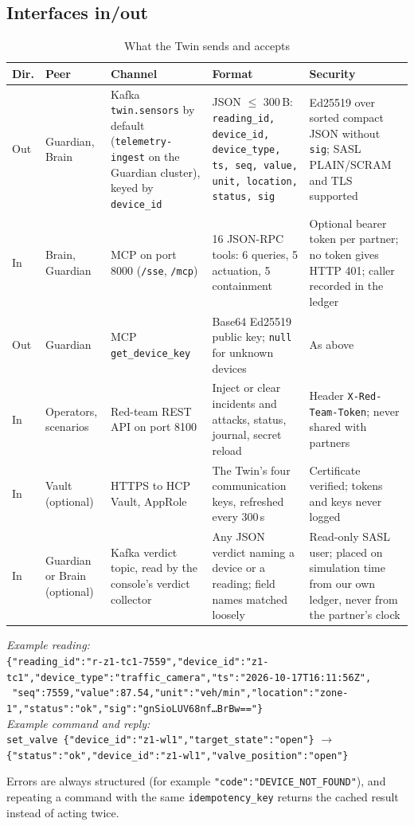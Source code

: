 \documentclass[10pt,a4paper]{article}
\begin{document}
\subsection{Interfaces in/out}
\begin{table}[H]
\centering
\scriptsize
\renewcommand{\arraystretch}{0.92}
\caption{What the Twin sends and accepts}
\label{tab:interfaces}
\begin{tabularx}{\textwidth}{L{0.8cm}L{1.6cm}L{3.6cm}L{4.1cm}Y}
\toprule
\textbf{Dir.} & \textbf{Peer} & \textbf{Channel} & \textbf{Format} & \textbf{Security} \\
\midrule
Out & Guardian, Brain & Kafka \texttt{twin.sensors} by default (\texttt{telemetry-ingest} on the Guardian cluster), keyed by \texttt{device\_id} & JSON $\le$ 300\,B: \texttt{reading\_id, device\_id, device\_type, ts, seq, value, unit, location, status, sig} & Ed25519 over sorted compact JSON without \texttt{sig}; SASL PLAIN/SCRAM and TLS supported \\
In & Brain, Guardian & MCP on port 8000 (\texttt{/sse}, \texttt{/mcp}) & 16 JSON-RPC tools: 6 queries, 5 actuation, 5 containment & Optional bearer token per partner; no token gives HTTP 401; caller recorded in the ledger \\
Out & Guardian & MCP \texttt{get\_device\_key} & Base64 Ed25519 public key; \texttt{null} for unknown devices & As above \\
In & Operators, scenarios & Red-team REST API on port 8100 & Inject or clear incidents and attacks, status, journal, secret reload & Header \texttt{X-Red-Team-Token}; never shared with partners \\
In & Vault (optional) & HTTPS to HCP Vault, AppRole & The Twin's four communication keys, refreshed every 300\,s & Certificate verified; tokens and keys never logged \\
In & Guardian or Brain (optional) & Kafka verdict topic, read by the console's verdict collector & Any JSON verdict naming a device or a reading; field names matched loosely & Read-only SASL user; placed on simulation time from our own ledger, never from the partner's clock \\
\bottomrule
\end{tabularx}
\end{table}

\begin{flushleft}\scriptsize
\textit{Example reading:}\\
\texttt{\{"reading\_id":"r-z1-tc1-7559","device\_id":"z1-tc1","device\_type":"traffic\_camera","ts":"2026-10-17T16:11:56Z",}\\
\texttt{\ "seq":7559,"value":87.54,"unit":"veh/min","location":"zone-1","status":"ok","sig":"gnSioLUV68nf\ldots BrBw=="\}}\\[2pt]
\textit{Example command and reply:}\\
\texttt{set\_valve \{"device\_id":"z1-wl1","target\_state":"open"\}} $\rightarrow$ \texttt{\{"status":"ok","device\_id":"z1-wl1","valve\_position":"open"\}}
\end{flushleft}
Errors are always structured (for example \texttt{"code":"DEVICE\_NOT\_FOUND"}), and repeating a command with the same \texttt{idempotency\_key} returns the cached result instead of acting twice.
\end{document}
